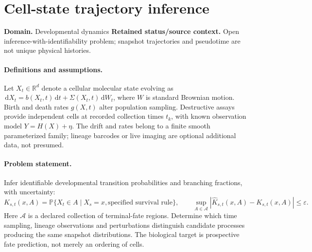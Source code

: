 \documentclass[11pt]{article}
\begin{document}
\section*{Cell-state trajectory inference}
\label{prob:071}
\label{rank:224}
\par\smallskip

\noindent\textbf{Domain.} Developmental dynamics \quad \textbf{Retained status/source context.} Open inference-with-identifiability problem; snapshot trajectories and pseudotime are not unique physical histories.
\paragraph{Definitions and assumptions.} Let $X_t\in\mathbb{R}^d$ denote a cellular molecular state evolving as $\,\mathrm{d} X_t=b(X_t,t)\,\mathrm{d} t+\Sigma(X_t,t)\,\mathrm{d} W_t$, where $W$ is standard Brownian motion. Birth and death rates $g(X,t)$ alter population sampling. Destructive assays provide independent cells at recorded collection times $t_k$, with known observation model $Y=H(X)+\eta$. The drift and rates belong to a finite smooth parameterized family; lineage barcodes or live imaging are optional additional data, not presumed.
\paragraph{Problem statement.} Infer identifiable developmental transition probabilities and branching fractions, with uncertainty:
\[K_{s,t}(x,A)=\mathbb{P}\{X_t\in A\mid X_s=x,\text{specified survival rule}\},\qquad \sup_{A\in\mathcal A}|\widehat K_{s,t}(x,A)-K_{s,t}(x,A)|\le\varepsilon.\]
Here $\mathcal A$ is a declared collection of terminal-fate regions. Determine which time sampling, lineage observations and perturbations distinguish candidate processes producing the same snapshot distributions. The biological target is prospective fate prediction, not merely an ordering of cells.
\end{document}

